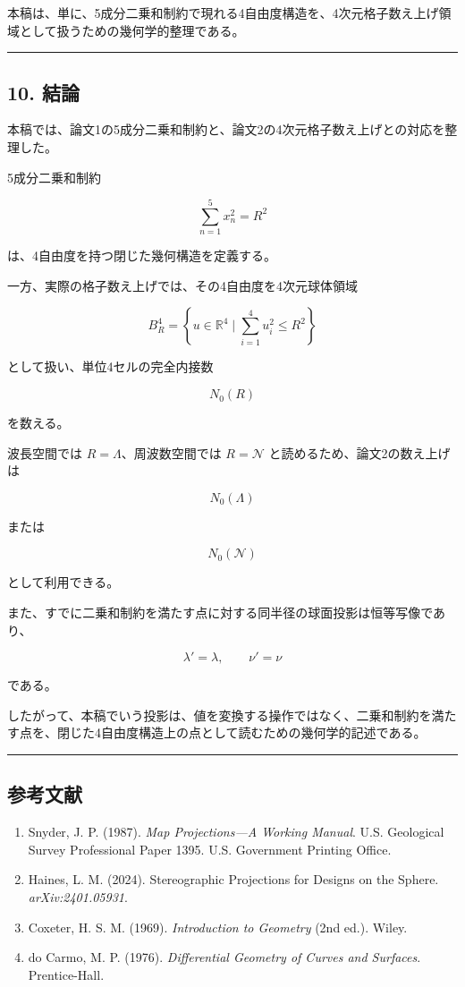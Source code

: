 \documentclass[
]{ltjsarticle}
\begin{document}
本稿は、単に、5成分二乗和制約で現れる4自由度構造を、4次元格子数え上げ領域として扱うための幾何学的整理である。

\begin{center}\rule{0.5\linewidth}{0.5pt}\end{center}

\subsection{10. 結論}\label{ux7d50ux8ad6}

本稿では、論文1の5成分二乗和制約と、論文2の4次元格子数え上げとの対応を整理した。

5成分二乗和制約

\[
\sum_{n=1}^{5}x_n^2=R^2
\]

は、4自由度を持つ閉じた幾何構造を定義する。

一方、実際の格子数え上げでは、その4自由度を4次元球体領域

\[
B^4_R
=
\left\{
u\in\mathbb{R}^4
\mid
\sum_{i=1}^{4}u_i^2\le R^2
\right\}
\]

として扱い、単位4セルの完全内接数

\[
N_0(R)
\]

を数える。

波長空間では \(R=\Lambda\)、周波数空間では \(R=\mathcal{N}\)
と読めるため、論文2の数え上げは

\[
N_0(\Lambda)
\]

または

\[
N_0(\mathcal{N})
\]

として利用できる。

また、すでに二乗和制約を満たす点に対する同半径の球面投影は恒等写像であり、

\[
\lambda'=\lambda,\qquad
\nu'=\nu
\]

である。

したがって、本稿でいう投影は、値を変換する操作ではなく、二乗和制約を満たす点を、閉じた4自由度構造上の点として読むための幾何学的記述である。

\begin{center}\rule{0.5\linewidth}{0.5pt}\end{center}

\subsection{参考文献}\label{ux53c2ux8003ux6587ux732e}

\begin{enumerate}
\def\labelenumi{\arabic{enumi}.}
\item
  Snyder, J. P. (1987). \emph{Map Projections---A Working Manual}. U.S.
  Geological Survey Professional Paper 1395. U.S. Government Printing
  Office.
\item
  Haines, L. M. (2024). Stereographic Projections for Designs on the
  Sphere. \emph{arXiv:2401.05931}.
\item
  Coxeter, H. S. M. (1969). \emph{Introduction to Geometry} (2nd ed.).
  Wiley.
\item
  do Carmo, M. P. (1976). \emph{Differential Geometry of Curves and
  Surfaces}. Prentice-Hall.
\end{enumerate}
\end{document}
